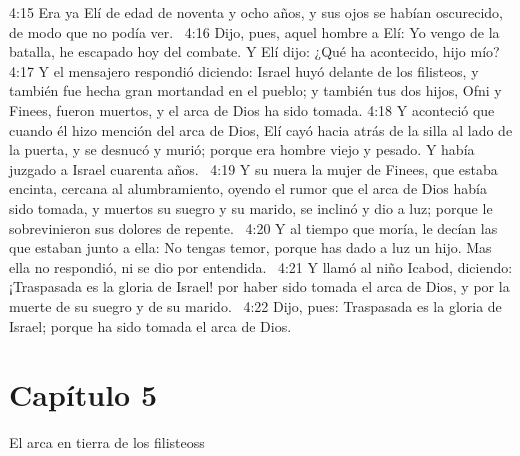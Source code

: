 4:15 Era ya Elí de edad de noventa y ocho años, y sus ojos se habían oscurecido, de modo que no podía ver.  
4:16 Dijo, pues, aquel hombre a Elí: Yo vengo de la batalla, he escapado hoy del combate. Y Elí dijo: ¿Qué ha acontecido, hijo mío?  
4:17 Y el mensajero respondió diciendo: Israel huyó delante de los filisteos, y también fue hecha gran mortandad en el pueblo; y también tus dos hijos, Ofni y Finees, fueron muertos, y el arca de Dios ha sido tomada. 
4:18 Y aconteció que cuando él hizo mención del arca de Dios, Elí cayó hacia atrás de la silla al lado de la puerta, y se desnucó y murió; porque era hombre viejo y pesado. Y había juzgado a Israel cuarenta años.  
4:19 Y su nuera la mujer de Finees, que estaba encinta, cercana al alumbramiento, oyendo el rumor que el arca de Dios había sido tomada, y muertos su suegro y su marido, se inclinó y dio a luz; porque le sobrevinieron sus dolores de repente.  
4:20 Y al tiempo que moría, le decían las que estaban junto a ella: No tengas temor, porque has dado a luz un hijo. Mas ella no respondió, ni se dio por entendida.  
4:21 Y llamó al niño Icabod, diciendo: ¡Traspasada es la gloria de Israel! por haber sido tomada el arca de Dios, y por la muerte de su suegro y de su marido.  
4:22 Dijo, pues: Traspasada es la gloria de Israel; porque ha sido tomada el arca de Dios.  
\section*{Capítulo 5}
El arca en tierra de los filisteoss  

